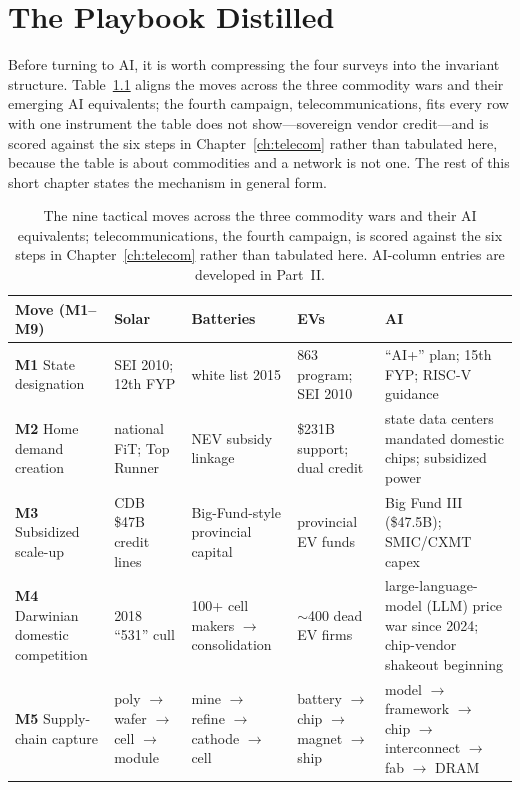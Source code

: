 \chapter{The Playbook Distilled}
\label{ch:playbook}

Before turning to AI, it is worth compressing the four surveys into the invariant structure. Table~\ref{tab:playbook} aligns the moves across the three commodity wars and their emerging AI equivalents; the fourth campaign, telecommunications, fits every row with one instrument the table does not show---sovereign vendor credit---and is scored against the six steps in Chapter~\ref{ch:telecom} rather than tabulated here, because the table is about commodities and a network is not one. The rest of this short chapter states the mechanism in general form.

\begin{table}[htbp]
  \centering
  \small
  \caption{The nine tactical moves across the three commodity wars and their AI equivalents; telecommunications, the fourth campaign, is scored against the six steps in Chapter~\ref{ch:telecom} rather than tabulated here. AI-column entries are developed in Part~II.}
  \label{tab:playbook}
  \setlength{\tabcolsep}{4pt}
  \begin{tabular}{p{28mm}p{25mm}p{25mm}p{25mm}p{34mm}}
    \toprule
    Move (M1--M9) & Solar & Batteries & EVs & AI \\
    \midrule
    \textbf{M1} State designation & SEI 2010; 12th FYP & white list 2015 & 863 program; SEI 2010 & ``AI+'' plan; 15th FYP; RISC-V guidance \\
    \addlinespace
    \textbf{M2} Home demand creation & national FiT; Top Runner & NEV subsidy linkage & \$231B support; dual credit & state data centers mandated domestic chips; subsidized power \\
    \addlinespace
    \textbf{M3} Subsidized scale-up & CDB \$47B credit lines & Big-Fund-style provincial capital & provincial EV funds & Big Fund III (\$47.5B); SMIC/CXMT capex \\
    \addlinespace
    \textbf{M4} Darwinian domestic competition & 2018 ``531'' cull & 100+ cell makers $\rightarrow$ consolidation & $\sim$400 dead EV firms & large-language-model (LLM) price war since 2024; chip-vendor shakeout beginning \\
    \addlinespace
    \textbf{M5} Supply-chain capture & poly $\rightarrow$ wafer $\rightarrow$ cell $\rightarrow$ module & mine $\rightarrow$ refine $\rightarrow$ cathode $\rightarrow$ cell & battery $\rightarrow$ chip $\rightarrow$ magnet $\rightarrow$ ship & model $\rightarrow$ framework $\rightarrow$ chip $\rightarrow$ interconnect $\rightarrow$ fab $\rightarrow$ DRAM \\

\end{tabular}
\end{table}
